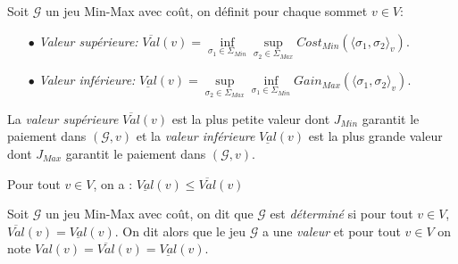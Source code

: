 
\begin{defi}
	
	Soit $\mathcal{G}$ un jeu Min-Max avec coût, on définit pour chaque sommet $v \in V$: 
	\begin{enumerate}
		\item[$\bullet$]\textit{Valeur supérieure:} $\overline{Val}(v) = \inf\limits_{\sigma _{1} \in \Sigma _{Min}} \sup\limits_{\sigma _{2} \in \Sigma_{Max}} Cost_{Min}(\langle \sigma _{1},\sigma _{2}\rangle_v)$.		
		\item[$\bullet$]\textit{Valeur inférieure:} $\underline{Val}(v) = \sup\limits_{\sigma _{2} \in \Sigma_{Max}}  \inf\limits_{\sigma _{1} \in \Sigma _{Min}} Gain_{Max}(\langle \sigma _{1},\sigma _{2}\rangle_v)$.
	\end{enumerate}
\end{defi}
\begin{rem}
	La \textit{valeur supérieure}  $\overline{Val}(v)$ est la plus petite valeur dont $J_{Min}$ garantit le paiement dans $(\mathcal{G},v)$ et la \textit{valeur inférieure} $\underline{Val}(v) $ est la plus grande valeur dont $J_{Max}$ garantit le paiement dans $(\mathcal{G},v)$.
\end{rem}

\begin{propriete}
	Pour tout $v \in V$, on a : $\underline{Val}(v) \leq \overline{Val}(v)$
\end{propriete}

\begin{defi}
		Soit $\mathcal{G}$ un jeu Min-Max avec coût, on dit que $\mathcal{G}$ est \textit{déterminé} si pour tout $v \in V$, $\overline{Val}(v) = \underline{Val}(v)$. On dit alors que le jeu $\mathcal{G}$ a une \textit{valeur} et pour tout $v \in V$ on note $Val(v) = \overline{Val}(v) = \underline{Val}(v)$.
\end{defi}


